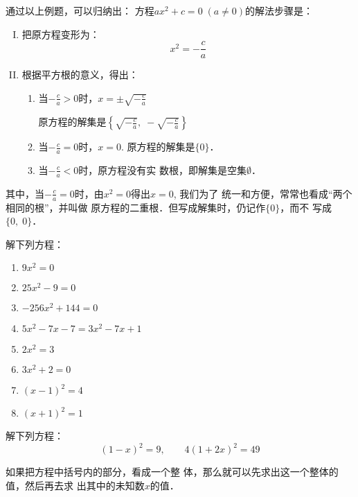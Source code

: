 通过以上例题，可以归纳出：
方程$ax^2+c=0\; (a\ne 0)$的解法步骤是：
\begin{blk}{}
\begin{enumerate}[I. ]
    \item 把原方程变形为：
    $$x^2=-\frac{c}{a}$$
    \item 根据平方根的意义，得出：
    \begin{enumerate}[1.]
        \item 当$-\frac{c}{a}>0$时，$x=\pm\sqrt{-\frac{c}{a}}$

    原方程的解集是$\left\{\sqrt{-\frac{c}{a}}, \; -\sqrt{-\frac{c}{a}}\right\}$
    \item 当$-\frac{c}{a}=0$时，$x=0$.
    原方程的解集是$\{0\}$．
    \item 当$-\frac{c}{a}<0$时，原方程没有实
    数根，即解集是空集$\emptyset$．
    \end{enumerate}
\end{enumerate}
\end{blk}

其中，当$-\frac{c}{a}=0$时，由$x^2=0$得出$x=0$, 我们为了
统一和方便，常常也看成“两个相同的根”，并叫做
原方程的二重根．但写成解集时，仍记作$\{0\}$，而不
写成$\{0,\; 0\}$．

\begin{ex}
    解下列方程：
\begin{multicols}{2}
\begin{enumerate}
    \item $9x^2=0$
    \item $25x^2-9=0$
    \item $-256x^2+144=0$ 
    \item $5x^2-7x-7=3x^2-7x+1$
    \item $2x^2=3$
    \item $3x^2+2=0$
    \item $(x-1)^2=4$
    \item $(x+1)^2=1$
\end{enumerate}
\end{multicols}
\end{ex}


\begin{example}
    解下列方程：
    \[(1-x)^2=9,\qquad 4(1+2x)^2=49\]
\end{example}

\begin{analyze}
    如果把方程中括号内的部分，看成一个整
体，那么就可以先求出这一个整体的值，然后再去求
出其中的未知数$x$的值．
\end{analyze}

